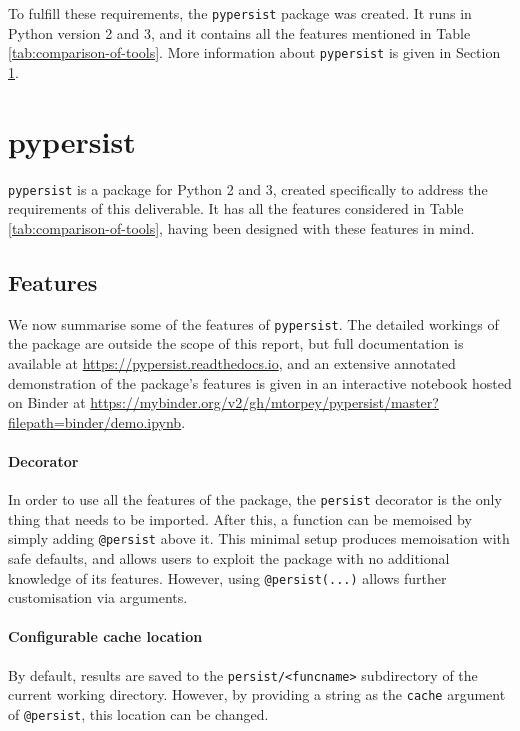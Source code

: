 \documentclass{deliverablereport}
\newcommand{\pypersist}{\texttt{pypersist}}
\begin{document}
To fulfill these requirements, the \pypersist{} package was created.  It runs in
Python version 2 and 3, and it contains all the features mentioned in Table
\ref{tab:comparison-of-tools}.  More information about \pypersist{} is given in
Section \ref{sec:pypersist}.

\section{pypersist}
\label{sec:pypersist}

\pypersist{} is a package for Python 2 and 3, created specifically to address
the requirements of this deliverable.  It has all the features considered in
Table \ref{tab:comparison-of-tools}, having been designed with these features in
mind.

\subsection{Features}
\label{sec:features}

We now summarise some of the features of \pypersist{}.  The detailed workings of
the package are outside the scope of this report, but full documentation is
available at \url{https://pypersist.readthedocs.io}, and an extensive annotated
demonstration of the package's features is given in an interactive notebook
hosted on Binder at
\url{https://mybinder.org/v2/gh/mtorpey/pypersist/master?filepath=binder/demo.ipynb}.

\paragraph{Decorator}
In order to use all the features of the package, the \texttt{persist} decorator
is the only thing that needs to be imported.  After this, a function can be
memoised by simply adding \texttt{@persist} above it.  This minimal setup
produces memoisation with safe defaults, and allows users to exploit the package
with no additional knowledge of its features.  However, using
\texttt{@persist(...)} allows further customisation via arguments.

\paragraph{Configurable cache location}
By default, results are saved to the \texttt{persist/<funcname>} subdirectory of
the current working directory.  However, by providing a string as the
\texttt{cache} argument of \texttt{@persist}, this location can be changed.
\end{document}
